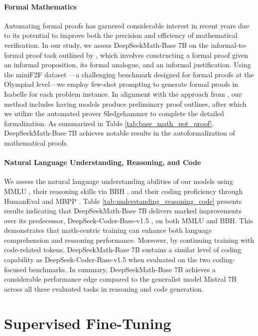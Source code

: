 \begin{itemize}[topsep=0pt]
\begin{itemize}[topsep=0pt]
\paragraph{Formal Mathematics}

Automating formal proofs has garnered considerable interest in recent years due to its potential to improve both the precision and efficiency of mathematical verification. In our study, we assess DeepSeekMath-Base 7B on the informal-to-formal proof task outlined by \citep{dsp_proof}, which involves constructing a formal proof given an informal proposition, its formal analogue, and an informal justification. Using the miniF2F dataset \citep{minif2f}—a challenging benchmark designed for formal proofs at the Olympiad level—we employ few-shot prompting to generate formal proofs in Isabelle for each problem instance. In alignment with the approach from \cite{dsp_proof}, our method includes having models produce preliminary proof outlines, after which we utilize the automated prover Sledgehammer \citep{sledgehammer} to complete the detailed formalization. As summarized in Table \ref{tab:base_math_pot_proof}, DeepSeekMath-Base 7B achieves notable results in the autoformalization of mathematical proofs.

\paragraph{Natural Language Understanding, Reasoning, and Code}

We assess the natural language understanding abilities of our models using MMLU \citep{mmlu}, their reasoning skills via BBH \citep{bbh}, and their coding proficiency through HumanEval \citep{codex} and MBPP \citep{mbpp}. Table \ref{tab:understanding_reasoning_code} presents results indicating that DeepSeekMath-Base 7B delivers marked improvements over its predecessor, DeepSeek-Coder-Base-v1.5 \citep{deepseek-coder}, on both MMLU and BBH. This demonstrates that math-centric training can enhance both language comprehension and reasoning performance. Moreover, by continuing training with code-related tokens, DeepSeekMath-Base 7B sustains a similar level of coding capability as DeepSeek-Coder-Base-v1.5 when evaluated on the two coding-focused benchmarks. In summary, DeepSeekMath-Base 7B achieves a considerable performance edge compared to the generalist model Mistral 7B \citep{mistral} across all three evaluated tasks in reasoning and code generation.

\section{Supervised Fine-Tuning}


\end{itemize}
\end{itemize}
